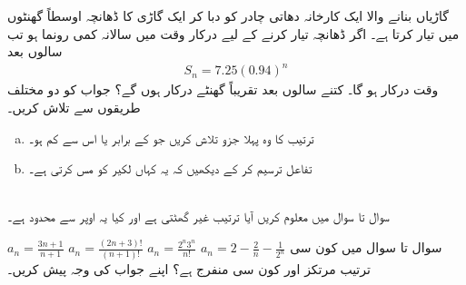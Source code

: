 گاڑیاں بنانے والا ایک کارخانہ دھاتی چادر کو دبا کر ایک گاڑی  کا ڈھانچہ  اوسطاً  گھنٹوں میں تیار کرتا ہے۔ اگر ڈھانچہ تیار کرنے کے لیے درکار وقت میں سالانہ   کمی رونما ہو تب  سالوں بعد
\begin{align*}
S_n=7.25(0.94)^n
\end{align*} 
وقت درکار ہو گا۔ کتنے سالوں بعد تقریباً  گھنٹے درکار ہوں گے؟ جواب کو دو مختلف طریقوں سے تلاش کریں۔
\begin{enumerate}[a.]
\item
ترتیب  کا وہ پہلا جزو تلاش کریں جو  کے برابر یا اس سے کم ہو۔
\item
تفاعل  ترسیم کر کے دیکھیں کہ  یہ  کہاں لکیر  کو مس کرتی ہے۔
\end{enumerate}
\\
سوال  تا سوال  میں معلوم کریں  آیا ترتیب غیر گھٹتی ہے اور کیا یہ اوپر سے محدود ہے۔

$a_n=\frac{3n+1}{n+1}$
$a_n=\frac{(2n+3)!}{(n+1)!}$
$a_n=\frac{2^n3^n}{n!}$
$a_n=2-\frac{2}{n}-\frac{1}{2^n}$
سوال  تا سوال  میں کون سی ترتیب مرتکز  اور کون سی منفرج ہے؟ اپنے جواب کی وجہ پیش کریں۔


